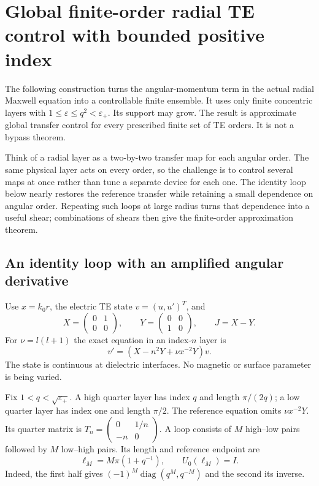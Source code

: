 \section{Global finite-order radial TE control with bounded positive index}
\label{cc:section}

The following construction turns the angular-momentum term in the
actual radial Maxwell equation into a controllable finite ensemble.
It uses only finite concentric layers with
$1\leq\varepsilon\leq q^2<\varepsilon_+$. Its support may grow.
The result is approximate global transfer control for every
prescribed finite set of TE orders. It is not a bypass theorem.

Think of a radial layer as a two-by-two transfer map for each angular order.
The same physical layer acts on every order, so the challenge is to control
several maps at once rather than tune a separate device for each one. The
identity loop below nearly restores the reference transfer while retaining a
small dependence on angular order. Repeating such loops at large radius turns
that dependence into a useful shear; combinations of shears then give the
finite-order approximation theorem.

\subsection{An identity loop with an amplified angular derivative}

Use $x=k_0r$, the electric TE state $v=(u,u')^T$, and
\begin{equation}\label{cc:matrices}
 X=\begin{pmatrix}0&1\\0&0\end{pmatrix},\qquad
 Y=\begin{pmatrix}0&0\\1&0\end{pmatrix},\qquad J=X-Y.
\end{equation}
For $\nu=l(l+1)$ the exact equation in an index-$n$ layer is
\begin{equation}\label{cc:actual-ode}
 v'=(X-n^2Y+\nu x^{-2}Y)v .
\end{equation}
The state is continuous at dielectric interfaces. No magnetic or
surface parameter is being varied.

Fix $1<q<\sqrt{\varepsilon_+}$. A high quarter layer has index $q$
and length $\pi/(2q)$; a low quarter layer has index one and length
$\pi/2$. The reference equation omits $\nu x^{-2}Y$. Its quarter
matrix is
$T_n=\left(\begin{smallmatrix}0&1/n\\-n&0\end{smallmatrix}\right)$.
A loop consists of $M$ high--low pairs followed by $M$ low--high
pairs. Its length and reference endpoint are
\begin{equation}\label{cc:loop-length}
 \ell_M=M\pi(1+q^{-1}),\qquad U_0(\ell_M)=I.
\end{equation}
Indeed, the first half gives
$(-1)^M\operatorname{diag}(q^M,q^{-M})$ and the second its inverse.

